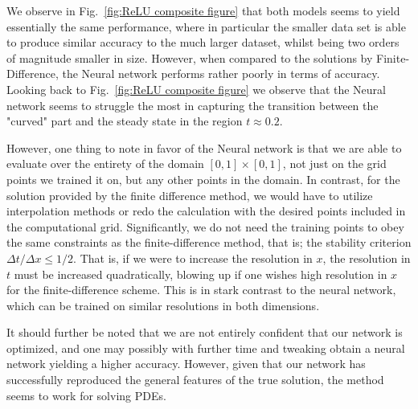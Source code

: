 \documentclass[reprint, english, nofootinbib]{revtex4-2}
\begin{document}
We observe in Fig.~\ref{fig:ReLU composite figure} that both models seems to yield essentially the same performance, where in particular the smaller data set is able to produce similar accuracy to the much larger dataset, whilst being two orders of magnitude smaller in size. However, when compared to the solutions by Finite-Difference, the Neural network performs rather poorly in terms of accuracy. Looking back to Fig.~\ref{fig:ReLU composite figure} we observe that the Neural network seems to struggle the most in capturing the transition between the "curved" part and the steady state in the region $t \approx 0.2$.

However, one thing to note in favor of the Neural network is that we are able to evaluate over the entirety of the domain $[0,1]\times[0,1]$, not just on the grid points we trained it on, but any other points in the domain. In contrast, for the solution provided by the finite difference method, we would have to utilize interpolation methods or redo the calculation with the desired points included in the computational grid. Significantly, we do not need the training points to obey the same constraints as the finite-difference method, that is; the stability criterion $\Delta t / \Delta x \leq 1/2$. That is, if we were to increase the resolution in $x$, the resolution in $t$ must be increased quadratically, blowing up if one wishes high resolution in $x$ for the finite-difference scheme. This is in stark contrast to the neural network, which can be trained on similar resolutions in both dimensions.

It should further be noted that we are not entirely confident that our network is optimized, and one may possibly with further time and tweaking obtain a neural network yielding a higher accuracy. However, given that our network has successfully reproduced the general features of the true solution, the method seems to work for solving PDEs. 
\end{document}
